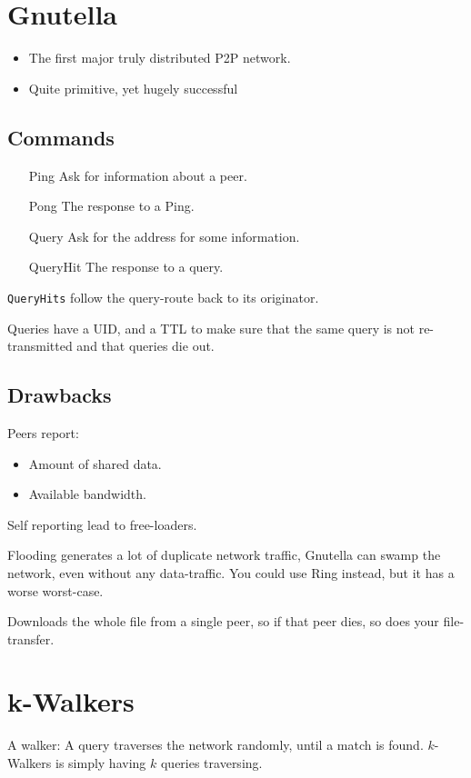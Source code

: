 	\section{Gnutella}
	\begin{itemize}
		\item The first major truly distributed P2P network.
		\item Quite primitive, yet hugely successful
	\end{itemize}
	
	\subsection{Commands}
	\begin{itemize}
		\item[Ping] Ask for information about a peer.
		\item[Pong] The response to a Ping.
		\item[Query] Ask for the address for some information.
		\item[QueryHit] The response to a query.
	\end{itemize}
	
	\texttt{QueryHits} follow the query-route back to its originator.
	
	Queries have a \gls{UID}, and a \gls{TTL} to make sure that the same query is not re-transmitted and that queries die out.
	
	\subsection{Drawbacks}
	Peers report:
	\begin{itemize}
		\item Amount of shared data.
		\item Available bandwidth.
	\end{itemize}
	Self reporting lead to free-loaders.
	
	Flooding generates a lot of duplicate network traffic, Gnutella can swamp the network, even without any data-traffic. You could use Ring instead, but it has a worse worst-case.
	
	Downloads the whole file from a single peer, so if that peer dies, so does your file-transfer.
	
	\section{k-Walkers}
	A walker: A query traverses the network randomly, until a match is found. $k$-Walkers is simply having $k$ queries traversing.
	
